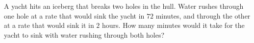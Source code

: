 A yacht hits an iceberg that breaks two holes in the hull. Water rushes through one hole at a rate that would sink the yacht in $72$ minutes, and through the other at a rate that would sink it in $2$ hours. How many minutes would it take for the yacht to sink with water rushing through both holes?
